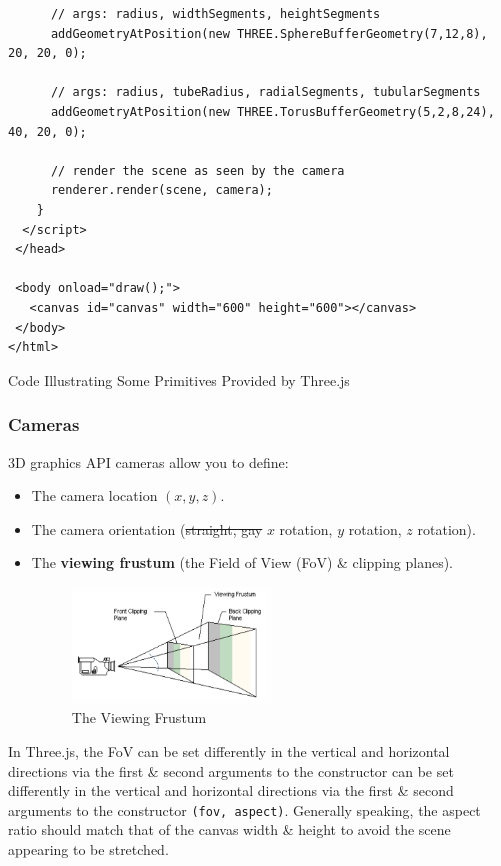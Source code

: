 \documentclass[a4paper,11pt]{article}
\newenvironment{code}{\captionsetup{type=listing}}{}
\begin{document}
\begin{code}
\begin{verbatim}
      // args: radius, widthSegments, heightSegments
      addGeometryAtPosition(new THREE.SphereBufferGeometry(7,12,8), 20, 20, 0);
      
      // args: radius, tubeRadius, radialSegments, tubularSegments
      addGeometryAtPosition(new THREE.TorusBufferGeometry(5,2,8,24), 40, 20, 0);
      
      // render the scene as seen by the camera
      renderer.render(scene, camera);
    }
  </script>
 </head>

 <body onload="draw();">
   <canvas id="canvas" width="600" height="600"></canvas>
 </body>
</html>
\end{verbatim}
\caption{Code Illustrating Some Primitives Provided by Three.js}
\end{code}

\subsubsection{Cameras}
3D graphics API cameras allow you to define:
\begin{itemize}
    \item   The camera location $(x,y,z)$.
    \item   The camera orientation (\sout{straight, gay} $x$ rotation, $y$ rotation, $z$ rotation).
    \item   The \textbf{viewing frustum} (the Field of View (FoV) \& clipping planes).
            \begin{figure}[H]
                \centering
                \includegraphics[width=0.5\textwidth]{images/viewing_frustum.png}
                \caption{The Viewing Frustum}
            \end{figure}
\end{itemize}

In Three.js, the FoV can be set differently in the vertical and horizontal directions via the first \& second arguments
to the constructor can be set differently in the vertical and horizontal directions via the first \& second arguments
to the constructor \texttt{(fov, aspect)}.
Generally speaking, the aspect ratio should match that of the canvas width \& height to avoid the scene appearing to be
stretched.
\end{document}
